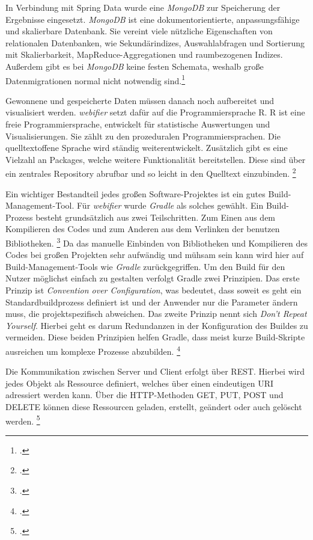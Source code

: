 In Verbindung mit Spring Data wurde eine \textit{MongoDB} zur Speicherung der Ergebnisse
eingesetzt. \textit{MongoDB} ist eine dokumentorientierte, anpassungsfähige und skalierbare
Datenbank. Sie vereint viele nützliche Eigenschaften von relationalen Datenbanken, wie
Sekundärindizes, Auswahlabfragen und Sortierung mit Skalierbarkeit, MapReduce-Aggregationen und
raumbezogenen Indizes. Außerdem gibt es bei \textit{MongoDB} keine festen Schemata, weshalb große
Datenmigrationen normal nicht notwendig sind.\footcite[Vgl.][1f]{mongodb}

Gewonnene und gespeicherte Daten müssen danach noch aufbereitet und visualisiert werden.
\textit{webifier} setzt dafür auf die Programmiersprache R. R ist eine freie Programmiersprache,
entwickelt für statistische Auswertungen und Visualisierungen. Sie zählt zu den prozeduralen
Programmiersprachen. Die quelltextoffene Sprache wird ständig weiterentwickelt.
Zusätzlich gibt es eine Vielzahl an Packages, welche weitere Funktionalität bereitstellen. Diese
sind über ein zentrales Repository abrufbar und so leicht in den Quelltext einzubinden.
\footcite[Vgl.][1ff]{R}

Ein wichtiger Bestandteil jedes großen Software-Projektes ist ein gutes Build-Management-Tool. Für
\textit{webifier} wurde \textit{Gradle} als solches gewählt. Ein Build-Prozess besteht grundsätzlich
aus zwei Teilschritten. Zum Einen aus dem Kompilieren des Codes und zum Anderen aus dem Verlinken
der benutzen Bibliotheken. \footcite[Vgl.][]{buildprozess} Da das manuelle Einbinden von
Bibliotheken und Kompilieren des Codes bei großen Projekten sehr aufwändig und mühsam sein kann
wird hier auf Build-Management-Tools wie \textit{Gradle} zurückgegriffen. Um den Build für den
Nutzer möglichst einfach zu gestalten verfolgt Gradle zwei Prinzipien. Das erste Prinzip ist
\textit{Convention over Configuration}, was bedeutet, dass soweit es geht ein Standardbuildprozess
definiert ist und der Anwender nur die Parameter ändern muss, die projektspezifisch abweichen. Das
zweite Prinzip nennt sich \textit{Don't Repeat Yourself}. Hierbei geht es darum Redundanzen in der
Konfiguration des Buildes zu vermeiden. Diese beiden Prinzipien helfen Gradle, dass meist kurze Build-Skripte ausreichen um komplexe Prozesse abzubilden. \footcite[Vgl.][6f]{gradle}

Die Kommunikation zwischen Server und Client erfolgt über \ac{REST}. Hierbei wird jedes Objekt als
Ressource definiert, welches über einen eindeutigen \ac{URI} adressiert werden kann. Über die
HTTP-Methoden GET, PUT, POST und DELETE können diese Ressourcen geladen, erstellt, geändert
oder auch gelöscht werden. \footcite[Vgl.][]{rest}

